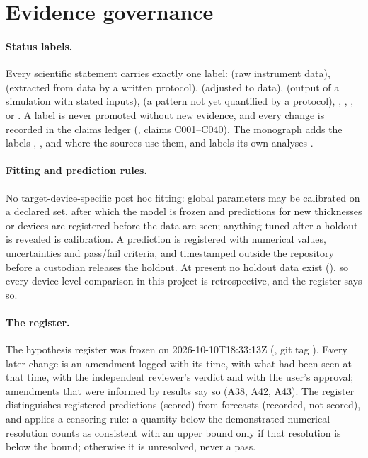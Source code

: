 \section{Evidence governance}
\label{sec:mono-q-gov}

\paragraph{Status labels.} Every scientific statement carries exactly one label:  (raw instrument data),
 (extracted from data by a written protocol),  (adjusted to data),  (output of a
simulation with stated inputs),  (a pattern not yet quantified by a protocol),
, , ,  or . A label is never
promoted without new evidence, and every change is recorded in the claims ledger (, claims
C001--C040). The monograph adds the labels , ,  and  where the
sources use them, and labels its own analyses .

\paragraph{Fitting and prediction rules.} No target-device-specific post hoc fitting: global parameters may be calibrated
on a declared set, after which the model is frozen and predictions for new thicknesses or devices are registered before
the data are seen; anything tuned after a holdout is revealed is calibration. A prediction is registered with numerical
values, uncertainties and pass/fail criteria, and timestamped outside the repository before a custodian releases the
holdout. At present no holdout data exist (), so every device-level comparison in this project is
retrospective, and the register says so.

\paragraph{The register.} The hypothesis register was frozen on 2026-10-10T18:33:13Z (, git tag
). Every later change is an amendment logged with its time, with what had been
seen at that time, with the independent reviewer's verdict and with the user's approval; amendments that were informed by
results say so (A38, A42, A43). The register distinguishes registered predictions (scored) from forecasts (recorded, not
scored), and applies a censoring rule: a quantity below the demonstrated numerical resolution counts as consistent with an
upper bound only if that resolution is below the bound; otherwise it is unresolved, never a pass.

